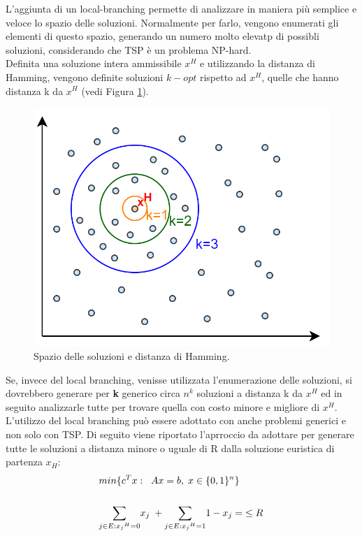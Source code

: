 L'aggiunta di un local-branching permette di analizzare in maniera più semplice e veloce lo spazio delle soluzioni. Normalmente per farlo, vengono enumerati gli elementi di questo spazio, generando un numero molto elevatp di possibli soluzioni, considerando che TSP è un problema NP-hard.\\
Definita una soluzione intera ammissibile $x^H$ e utilizzando la distanza di Hamming, vengono definite soluzioni $k-opt$ rispetto ad $x^H$, quelle che hanno distanza k da $x^H$ (vedi Figura \ref{opt}).\\
\begin{figure}[h] 
\begin{center} 
  \includegraphics[scale=0.38]{Images/opt}
  \caption{\footnotesize{Spazio delle soluzioni e distanza di Hamming.}} \label{opt} 
\end{center} 
\end{figure}
Se, invece del local branching, venisse utilizzata l'enumerazione delle soluzioni, si dovrebbero generare per \textbf{k} generico circa $n^k$ soluzioni a distanza k da $x^H$ ed in seguito analizzarle tutte per trovare quella con costo minore e migliore di $x^H$.\\
L'utilizzo del local branching può essere adottato con anche problemi generici e non solo con TSP. Di seguito viene riportato l'aprroccio da adottare per generare tutte le soluzioni a distanza minore o uguale di R dalla soluzione euristica di partenza $x_H$:
\begin{align}
& min \{ c^T x:\;\;Ax=b,\;x\in\{0,1\}^n\} \\ \notag \\
& \underset{j\in E:{x_j}^H=0}\sum{x_j}\;+ \underset{j\in E:{x_j}^H=1}\sum{1-x_j}=\; \leq R
\end{align}
